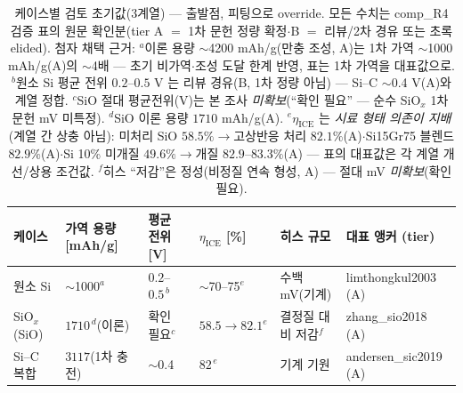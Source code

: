 \begin{table}[t]
\centering\footnotesize
\renewcommand{\arraystretch}{1.3}
\caption{케이스별 검토 초기값(3계열) --- 출발점, 피팅으로 override. 모든 수치는 comp\_R4 검증 표의 원문
확인분(tier A $=$ 1차 문헌 정량 확정$\cdot$B $=$ 리뷰/2차 경유 또는 초록 elided). 첨자 채택 근거:
$^a$이론 용량 $\sim$4200 mAh/g(만충 조성\cite{wen_huggins1981}, A)는 1차 가역 $\sim$1000
mAh/g\cite{limthongkul2003}(A)의 $\sim$4배 --- 초기 비가역$\cdot$조성 도달 한계 반영, 표는 1차 가역을
대표값으로. $^b$원소 Si 평균 전위 $0.2$--$0.5$ V 는 리뷰 경유\cite{obrovac_chevrier2014}(B, 1차 정량
아님) --- Si--C $\sim$0.4 V\cite{andersen_sic2019}(A)와 계열 정합. $^c$SiO 절대 평균전위(V)는 본 조사
\emph{미확보}(``확인 필요'' --- 순수 SiO$_x$ 1차 문헌 mV 미특정). $^d$SiO 이론 용량 $1710$
mAh/g\cite{zhang_sio2018}(A). $^e$$\eta_\mathrm{ICE}$ 는 \emph{시료 형태 의존이 지배}(계열 간 상충
아님): 미처리 SiO $58.5\%\to$고상반응 처리 $82.1\%$\cite{yom_sio2016}(A)$\cdot$Si15Gr75 블렌드
$82.9\%$\cite{gautam_blend2024}(A)$\cdot$Si 10\% 미개질 $49.6\%\to$개질 $82.9$--$83.3\%$\cite{naboka_sic2021}(A)
--- 표의 대표값은 각 계열 개선/상용 조건값. $^f$히스 ``저감''은 정성(비정질 연속 형성\cite{kitada_sio2019},
A) --- 절대 mV \emph{미확보}(확인 필요).}
\label{tab:si-cases}
\begin{tabular}{@{}p{} p{} p{} p{} p{} p{}@{}}
\toprule
케이스 & 가역 용량 [mAh/g] & 평균 전위 [V] & $\eta_\mathrm{ICE}$ [\%] & 히스 규모 & 대표 앵커 (tier) \\
\midrule
원소 Si       & $\sim$1000$^a$      & $0.2$--$0.5^{\,b}$ & $\sim$70--75$^e$ & 수백 mV(기계)     & limthongkul2003 (A) \\
SiO$_x$ (SiO) & $1710^{\,d}$(이론)   & 확인 필요$^c$      & $58.5\to82.1^e$  & 결정질 대비 저감$^f$ & zhang\_sio2018 (A) \\
Si--C 복합    & $3117$(1차 충전)     & $\sim$0.4          & $82^{\,e}$       & 기계 기원          & andersen\_sic2019 (A) \\
\bottomrule
\end{tabular}
\end{table}

